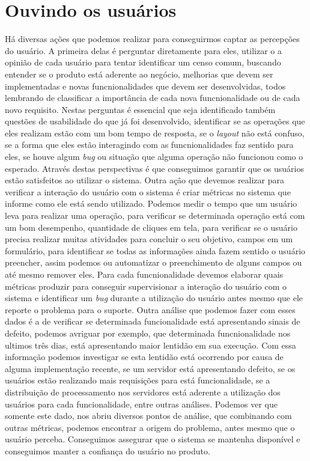     \section{Ouvindo os usuários}
      Há diversas ações que podemos realizar para conseguirmos captar as percepções
      do usuário. A primeira delas é perguntar diretamente para eles, utilizar o
      a opinião de cada usuário para tentar identificar um censo comum, buscando
      entender se o produto está aderente ao negócio, melhorias que devem ser
      implementadas e novas funcnionalidades que devem ser desenvolvidas, todos
      lembrando de classificar a importância de cada nova funcnionalidade ou de
      cada novo requisito. Nestas perguntas é essencial que seja identificado também
      questões de usabilidade do que já foi desenvolvido, identificar se as
      operações que eles realizam estão com um bom tempo de resposta, se o
      \textit{layout} não está confuso, se a forma que eles estão interagindo com
      as funcnionalidades faz sentido para eles, se houve algum \textit{bug} ou
      situação que alguma operação não funcionou como o esperado. Através destas
      perspectivas é que conseguimos garantir que os usuários estão satisfeitos
      ao utilizar o sistema. \newline
      Outra ação que devemos realizar para verificar a interação do usuário com o
      sistema é criar métricas no sistema que informe como ele está sendo utilizado.
      Podemos medir o tempo que um usuário leva para realizar uma operação, para
      verificar se determinada operação está com um bom desempenho, quantidade de
      cliques em tela, para verificar se o usuário precisa realizar muitas atividades
      para concluir o seu objetivo, campos em um formulário, para identificar se
      todas as informações ainda fazem sentido o usuário preencher, assim podemos
      ou automatizar o preenchimento de alguns campos ou até mesmo remover eles.
      Para cada funcnionalidade devemos elaborar quais métricas produzir para
      conseguir supervisionar a interação do usuário com o sistema e identificar
      um \textit{bug} durante a utilização do usuário antes mesmo que ele reporte
      o problema para o suporte. Outra análise que podemos fazer com esses dados é
      a de verificar se determinada funcionalidade está apresentando sinais de
      defeito, podemos avriguar por exemplo, que determinada funcnionalidade nos
      ultimos três dias, está apresentando maior lentidão em sua execução. Com
      essa informação podemos investigar se esta lentidão está ocorrendo por causa
      de alguma implementação recente, se um servidor está apresentando defeito,
      se os usuários estão realizando mais requisições para está funcionalidade,
      se a distribuição de processamento nos servidores está aderente a utilização
      dos usuários para cada funcionalidade, entre outras análises. Podemos ver que
      somente este dado, nos abriu diversos pontos de análise, que combinando com
      outras métricas, podemos encontrar a origem do problema, antes mesmo que o
      usuário perceba. Conseguimos assegurar que o sistema se mantenha disponível
      e conseguimos manter a confiança do usuário no produto.

